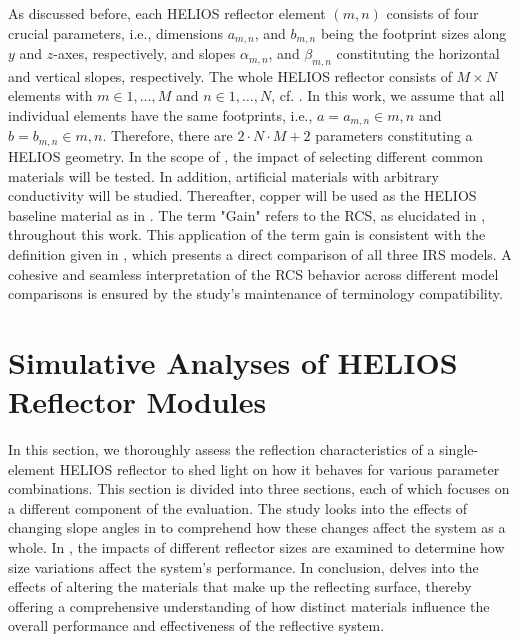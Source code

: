 As discussed before, each HELIOS reflector element $\left(m,n\right)$ consists of four crucial parameters, i.e., dimensions $a_{m,n}$, and $b_{m,n}$ being the footprint sizes along $y$ and $z$-axes, respectively, and slopes $\alpha_{m,n}$, and $\beta_{m,n}$ constituting the horizontal and vertical slopes, respectively. The whole HELIOS reflector consists of $M \times N$ elements with $m\in1,\dots,M$ and $n \in 1, \dots, N$, cf. . In this work, we assume that all individual elements have the same footprints, i.e., $a=a_{m,n}\in m,n$ and $b=b_{m,n} \in m, n$. Therefore, there are $2 \cdot N \cdot M + 2$ parameters constituting a HELIOS geometry. In the scope of , the impact of selecting different common materials will be tested. In addition, artificial materials with arbitrary conductivity will be studied. Thereafter, copper will be used as the HELIOS baseline material as in \cite{Helios}.
The term "Gain" refers to the RCS, as elucidated in , throughout this work. This application of the term gain is consistent with the definition given in , which presents a direct comparison of all three IRS models. A cohesive and seamless interpretation of the RCS behavior across different model comparisons is ensured by the study's maintenance of terminology compatibility.
\section{Simulative Analyses of HELIOS Reflector Modules} \label{Simulative Analyses of HELIOS Reflector Modules}
In this section, we thoroughly assess the reflection characteristics of a single-element HELIOS reflector to shed light on how it behaves for various parameter combinations. This section is divided into three sections, each of which focuses on a different component of the evaluation. The study looks into the effects of changing slope angles in  to comprehend how these changes affect the system as a whole. In , the impacts of different reflector sizes are examined to determine how size variations affect the system's performance. In conclusion,  delves into the effects of altering the materials that make up the reflecting surface, thereby offering a comprehensive understanding of how distinct materials influence the overall performance and effectiveness of the reflective system.

